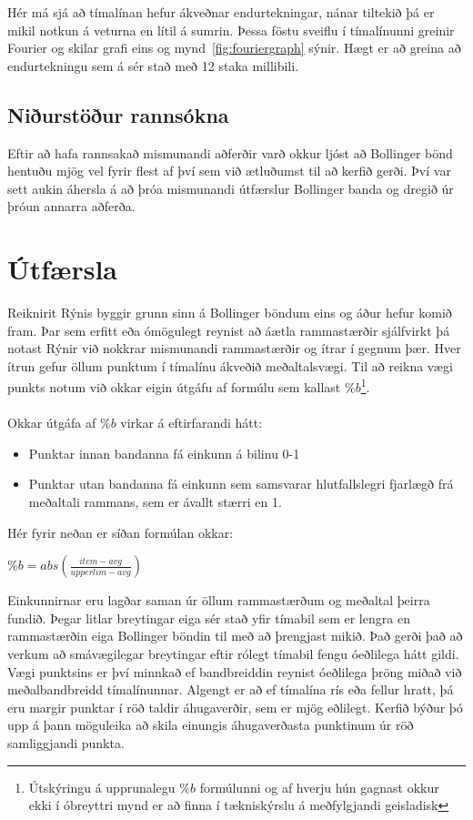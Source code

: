 \documentclass{article}
\begin{document}
Hér má sjá að tímalínan hefur ákveðnar endurtekningar, nánar tiltekið þá er mikil notkun á veturna en lítil á sumrin.
Þessa föstu sveiflu í tímalínunni greinir Fourier og skilar grafi eins og mynd~\ref{fig:fouriergraph} sýnir. 
Hægt er að greina að endurtekningu sem á sér stað með 12 staka millibili.

\subsection{Niðurstöður rannsókna}
Eftir að hafa rannsakað mismunandi aðferðir varð okkur ljóst að Bollinger bönd hentuðu
mjög vel fyrir flest af því sem við ætluðumst til að kerfið gerði.
Því var sett aukin áhersla á að þróa mismunandi útfærslur Bollinger banda og
dregið úr þróun annarra aðferða. 

\section{Útfærsla}
\label{sec:imp_our}
Reiknirit Rýnis byggir grunn sinn á Bollinger böndum eins og áður hefur komið fram.
Þar sem erfitt eða ómögulegt reynist að áætla rammastærðir sjálfvirkt þá notast Rýnir við nokkrar mismunandi
rammastærðir og ítrar í gegnum þær. Hver ítrun gefur öllum punktum í tímalínu ákveðið meðaltalsvægi. Til að reikna
vægi punkts notum við okkar eigin útgáfu af formúlu sem kallast 
$\%b$\footnote[1]{Útskýringu á upprunalegu $\%b$ formúlunni og af hverju hún gagnast okkur ekki í óbreyttri mynd er að finna í tækniskýrslu á meðfylgjandi geisladisk}. 
\\ \hfil
\\ \hfil
Okkar útgáfa af $\%b$ virkar á eftirfarandi hátt:
\begin{itemize}
  \item Punktar innan bandanna fá einkunn á bilinu 0-1
  \item Punktar utan bandanna fá einkunn sem samsvarar hlutfallslegri fjarlægð frá meðaltali rammans, sem er ávallt stærri en 1.
\end{itemize}


Hér fyrir neðan er síðan formúlan okkar:


\begin{center}
  $\%b=abs(\frac{item - avg}{upperlim - avg})$
\end{center}

Einkunnirnar eru lagðar saman úr öllum rammastærðum og meðaltal þeirra fundið.
Þegar litlar breytingar eiga sér stað yfir tímabil sem er lengra en rammastærðin eiga
Bollinger böndin til með að þrengjast mikið. Það gerði það að verkum að smávægilegar breytingar eftir
rólegt tímabil fengu óeðlilega hátt gildi. 
Vægi punktsins er því minnkað ef bandbreiddin reynist óeðlilega þröng miðað við meðalbandbreidd
tímalínunnar.
Algengt er að ef tímalína rís eða fellur hratt, þá eru margir punktar í röð
taldir áhugaverðir, sem er mjög eðlilegt.
Kerfið býður þó upp á þann möguleika að skila einungis áhugaverðasta punktinum
úr röð samliggjandi punkta.
\end{document}
